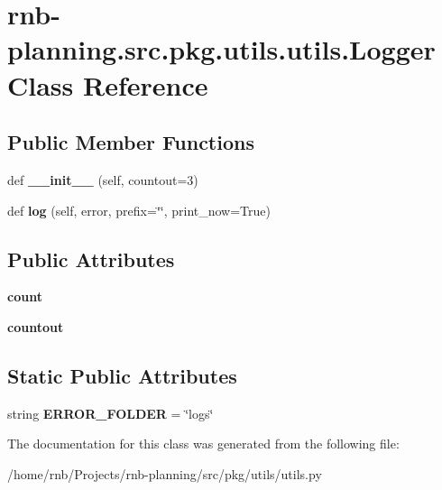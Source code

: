 \hypertarget{classrnb-planning_1_1src_1_1pkg_1_1utils_1_1utils_1_1_logger}{}\section{rnb-\/planning.src.\+pkg.\+utils.\+utils.\+Logger Class Reference}
\label{classrnb-planning_1_1src_1_1pkg_1_1utils_1_1utils_1_1_logger}
\subsection*{Public Member Functions}
\begin{DoxyCompactItemize}
\item 
\mbox{\label{classrnb-planning_1_1src_1_1pkg_1_1utils_1_1utils_1_1_logger_a65aa419fad34d053711d5181fd2af94a}} 
def {\bfseries \+\_\+\+\_\+init\+\_\+\+\_\+} (self, countout=3)
\item 
\mbox{\label{classrnb-planning_1_1src_1_1pkg_1_1utils_1_1utils_1_1_logger_a3eb5dee40e604cea9eef9169071bbe22}} 
def {\bfseries log} (self, error, prefix=\char`\"{}\char`\"{}, print\+\_\+now=True)
\end{DoxyCompactItemize}
\subsection*{Public Attributes}
\begin{DoxyCompactItemize}
\item 
\mbox{\label{classrnb-planning_1_1src_1_1pkg_1_1utils_1_1utils_1_1_logger_a1ef922dafa3fe5a185ba1d914acd8c7c}} 
{\bfseries count}
\item 
\mbox{\label{classrnb-planning_1_1src_1_1pkg_1_1utils_1_1utils_1_1_logger_a5f004a7c6bb57a22b2f72f9b99f2cc87}} 
{\bfseries countout}
\end{DoxyCompactItemize}
\subsection*{Static Public Attributes}
\begin{DoxyCompactItemize}
\item 
\mbox{\label{classrnb-planning_1_1src_1_1pkg_1_1utils_1_1utils_1_1_logger_aecefd922624623f7e6f196569ea0012b}} 
string {\bfseries E\+R\+R\+O\+R\+\_\+\+F\+O\+L\+D\+ER} = \char`\"{}logs\char`\"{}
\end{DoxyCompactItemize}


The documentation for this class was generated from the following file\+:\begin{DoxyCompactItemize}
\item 
/home/rnb/\+Projects/rnb-\/planning/src/pkg/utils/utils.\+py\end{DoxyCompactItemize}
